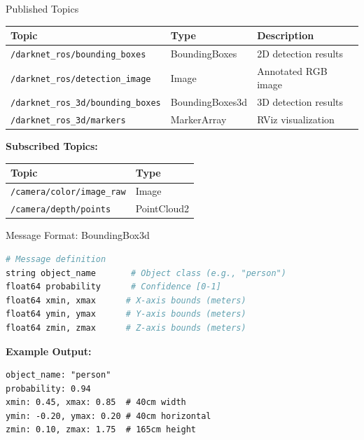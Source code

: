 \documentclass[aspectratio=169]{beamer}
\begin{document}
\begin{frame}{Published Topics}
\begin{table}
\scriptsize
\begin{tabular}{|l|l|p{4cm}|}
\hline
\textbf{Topic} & \textbf{Type} & \textbf{Description} \\
\hline
\texttt{/darknet\_ros/bounding\_boxes} & BoundingBoxes & 2D detection results \\
\hline
\texttt{/darknet\_ros/detection\_image} & Image & Annotated RGB image \\
\hline
\texttt{/darknet\_ros\_3d/bounding\_boxes} & BoundingBoxes3d & 3D detection results \\
\hline
\texttt{/darknet\_ros\_3d/markers} & MarkerArray & RViz visualization \\
\hline
\end{tabular}
\end{table}

\vspace{1em}
\textbf{Subscribed Topics:}
\begin{table}
\scriptsize
\begin{tabular}{|l|l|}
\hline
\textbf{Topic} & \textbf{Type} \\
\hline
\texttt{/camera/color/image\_raw} & Image \\
\hline
\texttt{/camera/depth/points} & PointCloud2 \\
\hline
\end{tabular}
\end{table}
\end{frame}

\begin{frame}[fragile]{Message Format: BoundingBox3d}
\begin{lstlisting}[language=bash]
# Message definition
string object_name       # Object class (e.g., "person")
float64 probability      # Confidence [0-1]
float64 xmin, xmax      # X-axis bounds (meters)
float64 ymin, ymax      # Y-axis bounds (meters)
float64 zmin, zmax      # Z-axis bounds (meters)
\end{lstlisting}

\vspace{1em}
\textbf{Example Output:}
\begin{lstlisting}[basicstyle=\tiny\ttfamily]
object_name: "person"
probability: 0.94
xmin: 0.45, xmax: 0.85  # 40cm width
ymin: -0.20, ymax: 0.20 # 40cm horizontal
zmin: 0.10, zmax: 1.75  # 165cm height
\end{lstlisting}
\end{frame}
\end{document}
